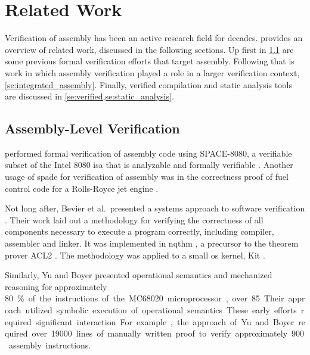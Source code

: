 \chapter{Related Work}\label{ch:related}

Verification of assembly has been an active research field for decades.
 provides an overview of related work,
discussed in the following sections.
Up first in \cref{se:previous_assembly}
are some previous formal verification efforts that target assembly.
Following that is work in which assembly verification played a role
in a larger verification context, \cref{se:integrated_assembly}.
Finally, verified compilation and static analysis tools are discussed
in \cref{se:verified,se:static_analysis}.





\section{Assembly-Level Verification}\label{se:previous_assembly}
\textcite{clutterbuck1988verification} performed formal verification
of assembly code using SPACE-8080, a verifiable subset of the Intel 8080
\ac{isa} that is analyzable and formally verifiable \autocite{carre1986spade}.
Another usage of \ac{spade} for verification of assembly
was in the correctness proof of fuel control code for a Rolls-Royce
jet engine \autocite{oneill1988verification}.

Not long after, Bevier et al.\ presented a systems approach
to software verification \autocite{bevier1989approach,boyer1979computational}.
Their work laid out a methodology for verifying the correctness
of all components necessary to execute a program correctly,
including compiler, assembler and linker.
It was implemented in \ac{nqthm} \autocite{boyer1979computational},
a precursor to the theorem prover ACL2 \autocite{ACL2}.
The methodology was applied to a small \ac{os} kernel, Kit \autocite{bevier1989kit}.

Similarly, Yu and Boyer \cite{yu1993automated,boyer1996automated}
presented operational semantics and mechanized reasoning
for approximately \SI{80}\percent of the instructions of the MC68020 microprocessor,
over 85.
Their approach utilized symbolic execution of operational semantics.
These early efforts required significant interaction.
For example, the approach of Yu and Boyer required over \num{19000}
lines of manually written proof to verify approximately \num{900} assembly instructions.

